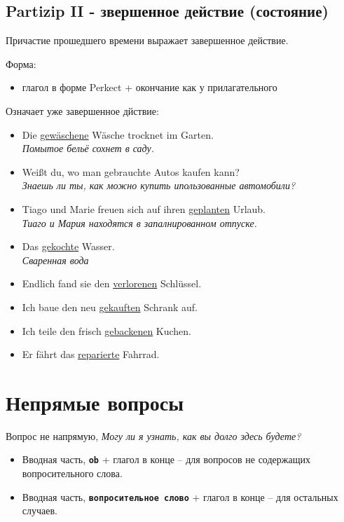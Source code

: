 \documentclass[12pt,a4paper]{report}
\newcommand{\term}[1]{\texttt{\textbf{#1}}}
\newcommand{\satzew}[1]{\underline{#1}}
\newcommand{\ubersatze}[1]{\textit{#1}}
\begin{document}
\section{Partizip II - звершенное действие (состояние)}

Причастие прошедшего времени выражает завершенное действие.

Форма:
\begin{itemize}
\item глагол в форме Perkect + окончание как у прилагательного
\end{itemize}

Означает уже завершенное дйствие:
\begin{itemize}
\item Die \satzew{gewäschene} Wäsche trocknet im Garten.
~\\ \ubersatze{Помытое бельё сохнет в саду.}
\item Weißt du, wo man gebrauchte Autos kaufen kann?
~\\ \ubersatze{Знаешь ли ты, как можно купить ипользованные автомобили?}
\item Tiago und Marie freuen sich auf ihren \satzew{geplanten} Urlaub.
~\\ \ubersatze{Тиаго и Мария находятся в запалнированном отпуске.}
\item Das \satzew{gekochte} Wasser.
~\\ \ubersatze{Сваренная вода}
\item Endlich fand sie den \satzew{verlorenen} Schlüssel.
\item Ich baue den neu \satzew{gekauften} Schrank auf.
\item Ich teile den frisch \satzew{gebackenen} Kuchen.
\item Er fährt das \satzew{reparierte} Fahrrad.
\end{itemize}

\chapter{Непрямые вопросы}
Вопрос не напрямую, \ubersatze{Могу ли я узнать, как вы долго здесь будете?}

\begin{itemize}
 \item Вводная часть, \term{ob} + глагол в конце -- для вопросов не содержащих вопросительного слова.
 \item Вводная часть, \term{вопросительное слово} + глагол в конце -- для остальных случаев.
\end{itemize}
\end{document}
